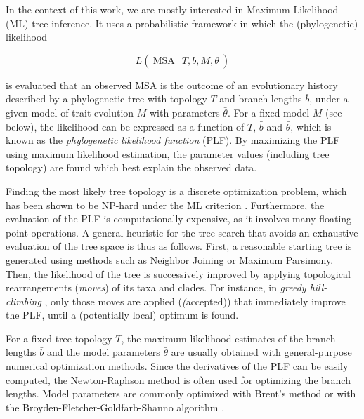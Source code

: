 In the context of this work, we are mostly interested in Maximum Likelihood (ML) tree inference.
It uses a probabilistic framework in which the (phylogenetic) likelihood

\begin{equation*}
    L(~ \mbox{MSA} ~|~ T, \bar{b}, M, \bar{\theta} ~)
\end{equation*}

is evaluated that an observed MSA is the outcome of an evolutionary history described by a phylogenetic tree
with topology $T$ and branch lengths $\bar{b}$, under a given model of trait evolution $M$ with parameters $\bar{\theta}$.
For a fixed model $M$ (see below), the likelihood can be expressed as a function of $T$, $\bar{b}$ and $\bar{\theta}$,
which is known as the \emph{phylogenetic likelihood function} (PLF).
By maximizing the PLF using maximum likelihood estimation,
the parameter values (including tree topology) are found which best explain the observed data.

Finding the most likely tree topology is a discrete optimization problem,
which has been shown to be NP-hard under the ML criterion \cite{Chor2005}.
Furthermore, the evaluation of the PLF is computationally expensive,
as it involves many floating point operations.
A general heuristic for the tree search that avoids an exhaustive evaluation of the tree space is thus as follows.
First, a reasonable starting tree is generated using methods such as Neighbor Joining or Maximum Parsimony.
Then, the likelihood of the tree is successively improved
by applying topological rearrangements (\emph{moves}) of its taxa and clades.
For instance, in \emph{greedy hill-climbing} \cite{Stamatakis2014}, only those moves are applied (\emph(accepted))
that immediately improve the PLF, until a (potentially local) optimum is found.

For a fixed tree topology $T$, the maximum likelihood estimates
of the branch lengths $\bar{b}$ and the model parameters $\bar{\theta}$
are usually obtained with general-purpose numerical optimization methods.
Since the derivatives of the PLF can be easily computed,
the Newton-Raphson method \cite{Ypma1995} is often used for optimizing the branch lengths.
Model parameters are commonly optimized with Brent's method \cite{Brent1971}
or with the Broyden-Fletcher-Goldfarb-Shanno algorithm \cite{Fletcher1987}.



